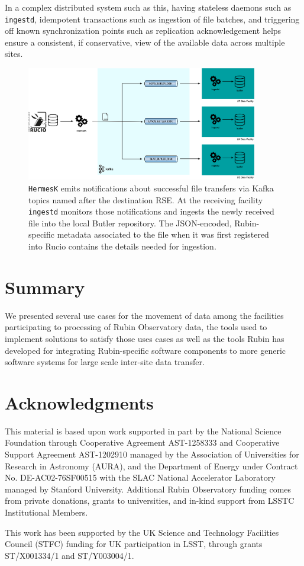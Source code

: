 \documentclass{webofc}
\begin{document}
In a complex distributed system such as this, having stateless daemons such as \texttt{ingestd}, idempotent transactions such as ingestion of file batches, and triggering off known synchronization points such as replication acknowledgement helps ensure a consistent, if conservative, view of the available data across multiple sites.

\begin{figure}[h]
\includegraphics[width=0.9\textwidth, center]{images/HermesAndIngestd.png}
\caption{\texttt{HermesK} emits notifications about successful file transfers via Kafka topics named after the destination RSE. At the receiving facility \texttt{ingestd} monitors those notifications and ingests the newly received file into the local Butler repository. The JSON-encoded, Rubin-specific metadata associated to the file when it was first registered into Rucio contains the details needed for ingestion.}
\label{fig:kafka-control-plane}
\end{figure}


\section{Summary}
\label{summary}
We presented several use cases for the movement of data among the facilities participating to processing of Rubin Observatory data, the tools used to implement solutions to satisfy those uses cases as well as the tools Rubin has developed for integrating Rubin-specific software components to more generic software systems for large scale inter-site data transfer.

\section{Acknowledgments}

This material is based upon work supported in part by the National Science Foundation through Cooperative Agreement AST-1258333 and Cooperative Support Agreement AST-1202910 managed by the Association of Universities for Research in Astronomy (AURA), and the Department of Energy under Contract No. DE-AC02-76SF00515 with the SLAC National Accelerator Laboratory managed by Stanford University. Additional Rubin Observatory funding comes from private donations, grants to universities, and in-kind support from LSSTC Institutional Members.

This work has been supported by the UK Science and Technology Facilities Council (STFC) funding for UK participation in LSST, through grants ST/X001334/1 and ST/Y003004/1.


\end{document}
